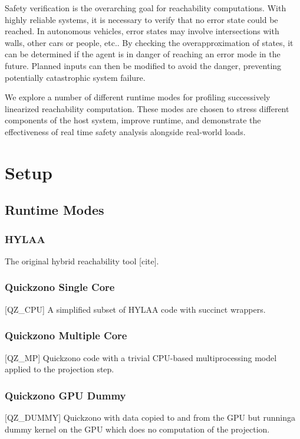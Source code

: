 \documentclass[runningheads]{llncs}
\begin{document}
Safety verification is the overarching goal for reachability computations. With highly reliable systems, it is necessary to verify that no error state could be reached. In autonomous vehicles, error states may involve intersections with walls, other cars or people, etc.. By checking the overapproximation of states, it can be determined if the agent is in danger of reaching an error mode in the future. Planned inputs can then be modified to avoid the danger, preventing potentially catastrophic system failure.

We explore a number of different runtime modes for profiling successively linearized reachability computation. These modes are chosen to stress different components of the host system, improve runtime, and demonstrate the effectiveness of real time safety analysis alongside real-world loads.


\section{Setup}


\subsection{Runtime Modes}

\subsubsection{HYLAA} \newline The original hybrid reachability tool [cite].
\subsubsection{Quickzono Single Core} [QZ\_CPU] \newline A simplified subset of HYLAA code with succinct wrappers.  \\
\subsubsection{Quickzono Multiple Core} [QZ\_MP] \newline Quickzono code with a trivial CPU-based multiprocessing model \newline applied to the projection step. \\
\subsubsection{Quickzono GPU Dummy} [QZ\_DUMMY] \newline Quickzono with data copied to and from the GPU but running\newline a dummy kernel on the GPU which does no computation of the projection. \\
\end{document}
